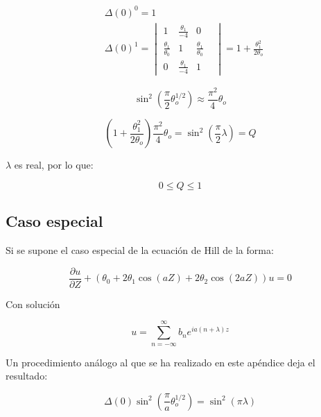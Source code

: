 \begin{equation}\label{eq:E.40}
\begin{aligned}
& \Delta(0)^0=1 \\
& \Delta(0)^1=
\begin{vmatrix}
 1 & \frac{\theta_1}{-4} & 0 \\ 
\frac{\theta_1}{\theta_0} & 1 & \frac{\theta_1}{\theta_0}  \\
 0 & \frac{\theta_1}{-4} & 1 &  
\end{vmatrix}
= 1+\frac{\theta_1^2}{2\theta_o}
\end{aligned}
\end{equation}

\begin{equation}\label{eq:E.41}
\sin^2(\frac{\pi}{2}\theta_o^{1/2}) \approx \frac{\pi^2}{4}\theta_o
\end{equation}

\begin{equation}\label{eq:E.42}
(1+\frac{\theta_1^2}{2\theta_o})\frac{\pi^2}{4}\theta_o=\sin^2(\frac{\pi}{2}\lambda) = Q
\end{equation}

$\lambda$ es real, por lo que:

\begin{equation}\label{eq:E.43}
0 \leq Q \leq 1
\end{equation}



\subsection{Caso especial}

Si se supone el caso especial de la ecuación de Hill de la forma:

\begin{equation}
    \frac{\partial u}{\partial Z}+\left(\theta_0+2\theta_1\cos(aZ)+2\theta_2\cos(2aZ)\right)u=0
\end{equation}

Con solución

\begin{equation}
    u=\sum^{\infty}_{n=-\infty} b_n e^{ia(n+\lambda)z}
\end{equation}

Un procedimiento análogo al que se ha realizado en este apéndice deja el resultado:

\begin{equation}
\Delta(0)\sin^2(\frac{\pi}{a}\theta_o^{1/2})=\sin^2(\pi\lambda)
\end{equation}

